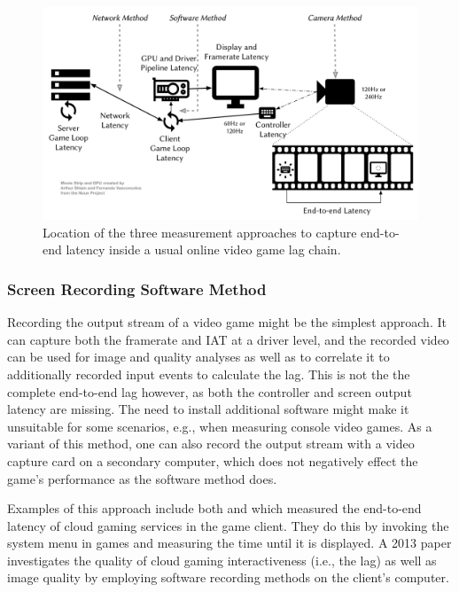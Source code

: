 \begin{figure}[!t]
    \centering
    \includegraphics[width=1.0\columnwidth]{../models/e2e-lag.pdf}
    \caption{Location of the three measurement approaches to capture end-to-end latency inside a usual online video game lag chain.}
\label{fig:measurement-methods}
\end{figure}


\subsubsection{Screen Recording Software Method}

Recording the output stream of a video game might be the simplest approach. It can capture both the framerate and \gls{IAT} at a driver level, and the recorded video can be used for image and quality analyses as well as to correlate it to additionally recorded input events to calculate the lag. This is not the the complete end-to-end lag however, as both the controller and screen output latency are missing. The need to install additional software might make it unsuitable for some scenarios, e.g., when measuring console video games. As a variant of this method, one can also record the output stream with a video capture card on a secondary computer, which does not negatively effect the game's performance as the software method does.

Examples of this approach include both \cite{Chen:2011:MLC:2072298.2071991} and \cite{6670099} which measured the end-to-end latency of cloud gaming services in the game client. They do this by invoking the system menu in games and measuring the time until it is displayed. A 2013 paper \cite{6574660} investigates the quality of cloud gaming interactiveness (i.e., the lag) as well as image quality by employing software recording methods on the client's computer.


